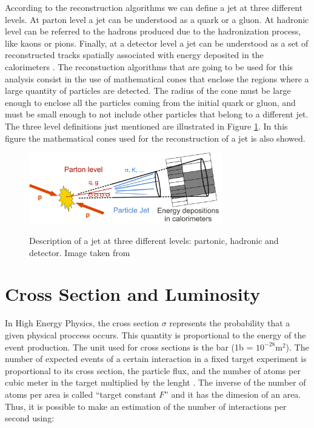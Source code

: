 According to the reconstruction algorithms we can define a jet at three different levels. At parton level a jet can be understood as a quark or a gluon. At hadronic level can be referred to the hadrons produced due to the hadronization process, like kaons or pions. Finally, at a detector level a jet can be understood as a set of reconstructed tracks spatially associated with energy 
 deposited in the calorimeters \cite{Tesis_luis_alfredo}. The reconstuction algorithms that are going to be used for this analysis consist in the use of mathematical cones that enclose the regions where a large quantity of particles are detected. The radius of the cone must be large enough to enclose all the particles coming from the initial quark or gluon, and must be small enough to not include other particles that belong to a different jet. The three level definitions just mentioned are illustrated in Figure \ref{Jets_definitions}. In this figure the mathematical cones used for the reconstruction of a jet is also showed.
  
 \begin{figure}[h] 
 \centering
 \caption{Description of a jet at three different levels: partonic, hadronic and detector. Image taken from \cite{Image_jet_definitions}}
 \includegraphics[width=0.75\textwidth]{./Capitulos/VariableDefinitions/jets_definitions}  
 \label{Jets_definitions}
 \end{figure}
 
 \section{Cross Section and Luminosity}
 
 In High Energy Physics, the cross section $\sigma$ represents the probability that a given physical proccess occurs. This quantity is proportional to the energy of the event production. The unit 
 used for cross sections is the bar (1b = $10^{-28} \text{m}^2$). The number of expected events of a certain interaction in a fixed target experiment is proportional to its cross section, the particle flux, and the
 number of atoms per cubic meter in the target multiplied by the lenght \cite{Data_analysis_techniques}. The inverse of the number of atoms per area is called ``target constant $F$'' and it has the dimesion of an area. Thus, it 
 is possible to make an estimation of the number of interactions per second using:
 
